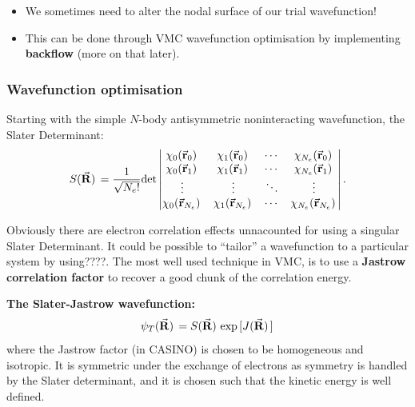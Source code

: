 \documentclass[10pt]{beamer}
\begin{document}
\begin{frame}[allowframebreaks]
    \begin{itemize}
        \item[\textbullet] We sometimes need to alter the nodal surface of our trial wavefunction!
        \item[\textbullet] This can be done through VMC wavefunction optimisation by implementing \textbf{backflow} (more on that later).
    \end{itemize}

\end{frame}

\begin{frame}[allowframebreaks]
    \frametitle{Wavefunction optimisation}
    Starting with the simple $N$-body antisymmetric noninteracting wavefunction, the Slater Determinant:
    \begin{equation}
        S\pqty*{\va{R}}=\frac{1}{\sqrt{N_e!}}\text{det}\vmqty{%
            \chi_0\pqty*{\va{r}_0}     & \chi_1\pqty*{\va{r}_0}     & \cdots & \chi_{N_e}\pqty*{\va{r}_0} \\
            \chi_0\pqty*{\va{r}_1}     & \chi_1\pqty*{\va{r}_1}     & \cdots & \chi_{N_e}\pqty*{\va{r}_1} \\
            \vdots                     & \vdots                     & \ddots & \vdots                     \\
            \chi_0\pqty*{\va{r}_{N_e}} & \chi_1\pqty*{\va{r}_{N_e}} & \cdots & \chi_{N_e}\pqty*{\va{r}_{N_e}}
        }.
    \end{equation}
    \framebreak%

    Obviously there are electron correlation effects unnacounted for using a singular Slater Determinant. It could be possible to ``tailor'' a wavefunction to a particular system by using????.\medskip\newline
    The most well used technique in VMC, is to use a \textbf{Jastrow correlation factor} to recover a good chunk of the correlation energy.
    \framebreak%

    \textbf{The Slater-Jastrow wavefunction:}
    \begin{equation}
        \psi_T\pqty*{\va{R}}=S\pqty*{\va{R}}\exp\bqty*{J\pqty*{\va{R}}}
    \end{equation}
    where the Jastrow factor (in CASINO) is chosen to be homogeneous and isotropic. It is symmetric under the exchange of electrons as symmetry is handled by the Slater determinant, and it is chosen such that the kinetic energy is well defined.
    \framebreak%


\end{frame}
\end{document}
